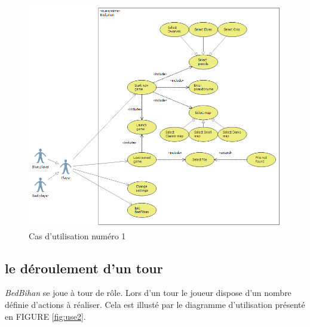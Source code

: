 		\begin{figure}
			\begin{center}
				\includegraphics[width=1\textwidth]{figure/cas_utilisation_1.png}
			\end{center}
			\caption{Cas d'utilisation numéro 1}
			\label{fig:use1}
		\end{figure}



	\subsection{le déroulement d'un tour}

		\emph{BedBihan} se joue à tour de rôle. Lors d'un tour le joueur dispose d'un nombre définie d'actions à réaliser. Cela est illusté par le diagramme d'utilisation présenté en FIGURE \ref{fig:use2}.

